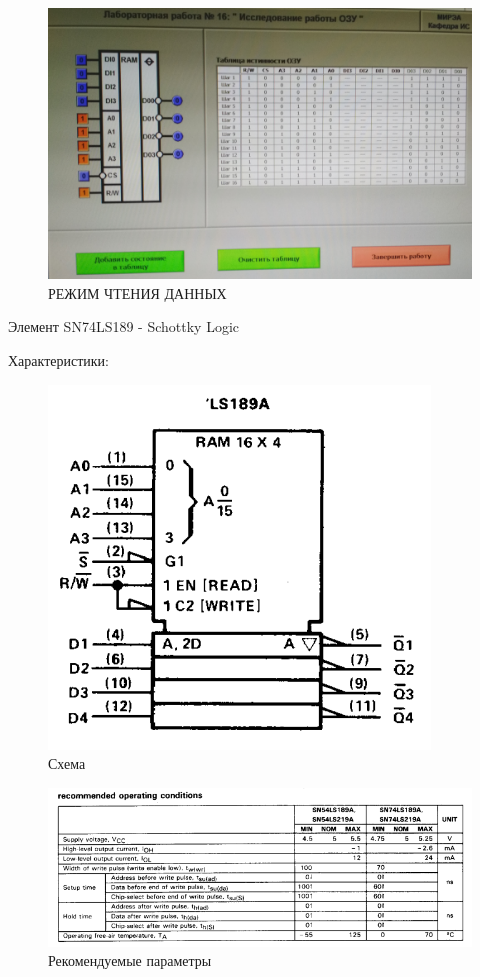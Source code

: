 \begin{figure}[H]
	\centering
	\includegraphics[width=0.95\linewidth]{imgs/16/2}
	\caption{РЕЖИМ ЧТЕНИЯ ДАННЫХ}
	\label{fig:16_2}
\end{figure}

Элемент SN74LS189 - Schottky Logic

Характеристики:

\begin{figure}[H]
	\centering
	\includegraphics[width=0.7\linewidth]{imgs/16/16_sh}
	\caption{Схема}
	\label{fig:16_sh}
\end{figure}

\begin{figure}[H]
	\centering
	\includegraphics[width=0.95\linewidth]{imgs/16/16_rec}
	\caption{Рекомендуемые параметры}
	\label{fig:16_rec}
\end{figure}

